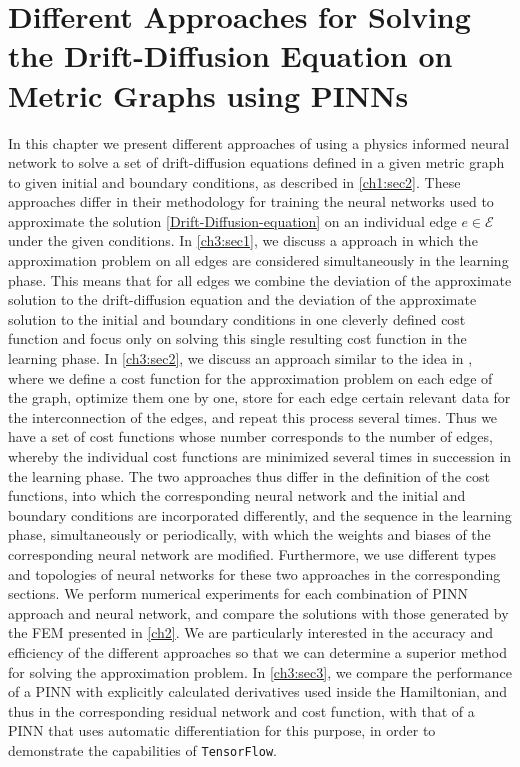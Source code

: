 \chapter{Different Approaches for Solving the Drift-Diffusion Equation on Metric Graphs using PINNs}

In this chapter we present different approaches of using a physics informed neural network to solve a set of drift-diffusion equations defined in a given metric graph to given initial and boundary conditions, as described in \cref{ch1:sec2}. These approaches differ in their methodology for training the neural networks used to approximate the solution \cref{Drift-Diffusion-equation} on an individual edge $e \in \mathcal{E}$ under the given conditions. In \cref{ch3:sec1}, we discuss a approach in which the approximation problem on all edges are considered simultaneously in the learning phase. This means that for all edges we combine the deviation of the approximate solution to the drift-diffusion equation and the deviation of the approximate solution to the initial and boundary conditions in one cleverly defined cost function and focus only on solving this single resulting cost function in the learning phase. In \cref{ch3:sec2}, we discuss an approach similar to the idea in \cite{JagtapKharazmiKarniadakis:2020}, where we define a cost function for the approximation problem on each edge of the graph, optimize them one by one, store for each edge certain relevant data for the interconnection of the edges, and repeat this process several times. Thus we have a set of cost functions whose number corresponds to the number of edges, whereby the individual cost functions are minimized several times in succession in the learning phase. The two approaches thus differ in the definition of the cost functions, into which the corresponding neural network and the initial and boundary conditions are incorporated differently, and the sequence in the learning phase, simultaneously or periodically, with which the weights and biases of the corresponding neural network are modified. Furthermore, we use different types and topologies of neural networks for these two approaches in the corresponding sections. We perform numerical experiments for each combination of PINN approach and neural network, and compare the solutions with those generated by the FEM presented in \cref{ch2}. We are particularly interested in the accuracy and efficiency of the different approaches so that we can determine a superior method for solving the approximation problem. In \cref{ch3:sec3}, we compare the performance of a PINN with explicitly calculated derivatives used inside the Hamiltonian, and thus in the corresponding residual network and cost function, with that of a PINN that uses automatic differentiation for this purpose, in order to demonstrate the capabilities of \lstinline!TensorFlow!. \\
